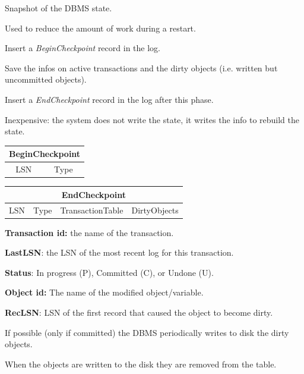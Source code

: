 \documentclass{beamer}
\begin{document}
\begin{slide}{
	\item Snapshot of the DBMS state.
	\item Used to reduce the amount of work during a restart.
	\item Insert a \textit{BeginCheckpoint} record in the log.
	\item Save the infos on active transactions and the dirty objects (i.e. written but uncommitted objects).
	\item Insert a \textit{EndCheckpoint} record in the log after this phase.
	\item Inexpensive: the system does not write the state, it writes the info to rebuild the state.
	\begin{table}
		\tiny
		\begin{tabular}{|c|c|}
			\hline
			\multicolumn{2}{|c|}{\textbf{BeginCheckpoint}} \\
			\hline
			LSN & Type \\
			\hline
		\end{tabular}
	\end{table}
	\begin{table}
		\tiny
		\begin{tabular}{|c|c|c|c|}
			\hline
			\multicolumn{4}{|c|}{\textbf{EndCheckpoint}} \\
			\hline
			LSN & Type & TransactionTable & DirtyObjects \\
			\hline
		\end{tabular}
	\end{table}
}\end{slide}

\begin{slide}{
	\item \textbf{Transaction id: } the name of the transaction.
	\item \textbf{LastLSN}: the LSN of the most recent log for this transaction.
	\item \textbf{Status}: In progress (P), Committed (C), or Undone (U).
}\end{slide}

\begin{slide}{
	\item \textbf{Object id: } The name of the modified object/variable.
	\item \textbf{RecLSN}: LSN of the first record that caused the object to become dirty.
	\item If possible (only if committed) the DBMS periodically writes to disk the dirty objects.
	\item When the objects are written to the disk they are removed from the table.
}\end{slide}
\end{document}
